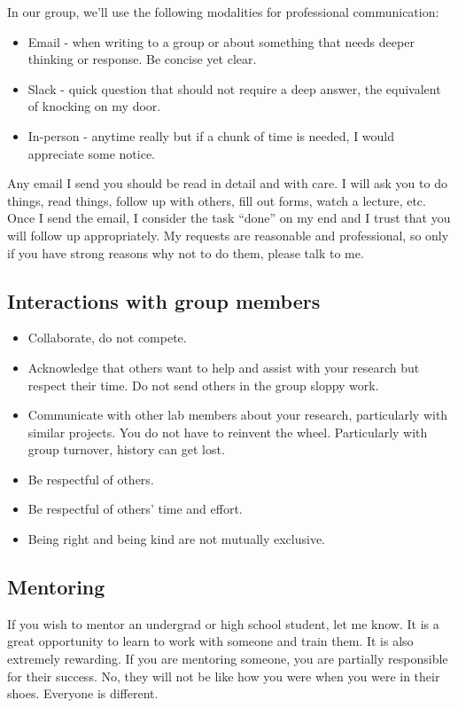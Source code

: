 \documentclass[12pt]{article}
\begin{document}
In our group, we'll use the following modalities for professional communication:
\begin{itemize}
  \item Email - when writing to a group or about something that needs deeper thinking or response.
        Be concise yet clear.
  \item Slack - quick question that should not require a deep answer, the equivalent of knocking on my door.
  \item In-person - anytime really but if a chunk of time is needed, I would appreciate some notice.
\end{itemize}

Any email I send you should be read in detail and with care.
I will ask you to do things, read things, follow up with others, fill out forms, watch a lecture, etc. Once I send the email, I consider the task ``done'' on my end and I trust that you will follow up appropriately.
My requests are reasonable and professional, so only if you have strong reasons why not to do them, please talk to me.

\subsection{Interactions with group members}

\begin{itemize}
  \item Collaborate, do not compete.
  \item Acknowledge that others want to help and assist with your research but respect their time.
        Do not send others in the group sloppy work.
  \item Communicate with other lab members about your research, particularly with similar projects.
        You do not have to reinvent the wheel.
        Particularly with group turnover, history can get lost.
  \item Be respectful of others.
  \item Be respectful of others' time and effort.
  \item Being right and being kind are not mutually exclusive.
\end{itemize}

\subsection{Mentoring}

If you wish to mentor an undergrad or high school student, let me know.
It is a great opportunity to learn to work with someone and train them.
It is also extremely rewarding.
If you are mentoring someone, you are partially responsible for their success.
No, they will not be like how you were when you were in their shoes.
Everyone is different.
\end{document}
